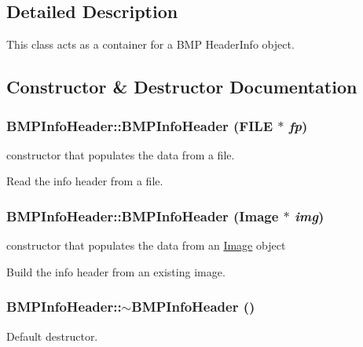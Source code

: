 \subsection{Detailed Description}
This class acts as a container for a BMP HeaderInfo object. 

\subsection{Constructor \& Destructor Documentation}
\hypertarget{classCartWheel_1_1Util_1_1BMPInfoHeader_a442b6897863ef05ef133ea563144aa55}{
\subsubsection[{BMPInfoHeader}]{\setlength{\rightskip}{0pt plus 5cm}BMPInfoHeader::BMPInfoHeader (FILE $\ast$ {\em fp})}}
\label{classCartWheel_1_1Util_1_1BMPInfoHeader_a442b6897863ef05ef133ea563144aa55}
constructor that populates the data from a file.

Read the info header from a file. \hypertarget{classCartWheel_1_1Util_1_1BMPInfoHeader_a6549427b2fc503fd9823db3b3fbee3ec}{
\subsubsection[{BMPInfoHeader}]{\setlength{\rightskip}{0pt plus 5cm}BMPInfoHeader::BMPInfoHeader ({\bf Image} $\ast$ {\em img})}}
\label{classCartWheel_1_1Util_1_1BMPInfoHeader_a6549427b2fc503fd9823db3b3fbee3ec}
constructor that populates the data from an \hyperlink{classCartWheel_1_1Util_1_1Image}{Image} object

Build the info header from an existing image. \hypertarget{classCartWheel_1_1Util_1_1BMPInfoHeader_afe2a51a77fcfd050a6d66f367976e603}{
\subsubsection[{$\sim$BMPInfoHeader}]{\setlength{\rightskip}{0pt plus 5cm}BMPInfoHeader::$\sim$BMPInfoHeader ()}}
\label{classCartWheel_1_1Util_1_1BMPInfoHeader_afe2a51a77fcfd050a6d66f367976e603}
Default destructor.

